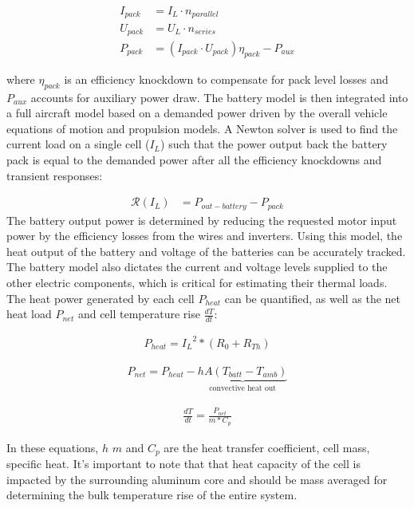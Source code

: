 \documentclass[]{aiaa-tc}%
\begin{document}
\begin{align}
I_{pack} &= I_L \cdot n_{parallel} \label{eq:I_pack} \\
U_{pack} &= U_L \cdot n_{series} \label{eq:U_pack} \\
P_{pack} &= (I_{pack} \cdot U_{pack}) \eta_{pack} - P_{aux} \label{eq:P_pack}
\end{align}

where $\eta_{pack}$ is an efficiency knockdown to compensate for pack level losses and $P_{aux}$ accounts for auxiliary power draw.
%
The battery model is then integrated into a full aircraft model based on a demanded power driven by the overall vehicle equations of motion and propulsion models. 
A Newton solver is used to find the current load on a single cell ($I_L$) such that the power output back the battery pack is equal to the demanded power after all the efficiency knockdowns and transient responses:

\begin{align}
\mathcal{R}(I_L) &= P_{out-battery} - P_{pack} \label{eq:resid_I_L}
\end{align}
%
The battery output power is determined by reducing the requested motor input power by the efficiency losses from the wires and inverters.  Using this model, the heat output of the battery and voltage of the batteries can be accurately tracked. The battery model also dictates the current and voltage levels supplied to the other electric components, which is critical for estimating their thermal loads. The heat power generated by each cell $P_{heat}$ can be quantified, as well as the net heat load $P_{net}$ and cell temperature rise $\frac{dT}{dt}$:

\begin{align}
P_{heat} = {I_L}^2 * (R_0 + R_{Th})
\label{eq:heat}
\end{align}

\begin{align}
P_{net} = P_{heat} - \underbrace{hA(T_{batt}-T_{amb})}_{\text{convective heat out}}
\label{eq:heatBalance}
\end{align}

\begin{align}
\frac{dT}{dt} = \frac{P_{net}}{m*C_p}
\label{eq:heatRise}
\end{align}

In these equations, $h$ $m$ and $C_p$ are the heat transfer coefficient, cell mass, specific heat. It's important to note that that heat capacity of the cell is impacted by the surrounding aluminum core and should be mass averaged for determining the bulk temperature rise of the entire system.
\end{document}

